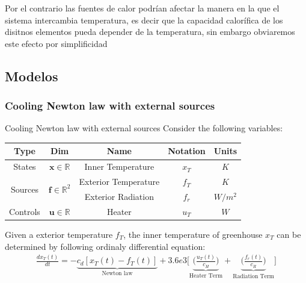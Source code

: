     Por el contrario las fuentes de calor podrían afectar la manera en la que el sistema intercambia  temperatura, es decir que la capacidad calorífica de los disitnos elementos pueda depender de la temperatura, sin embargo obviaremos este efecto por simplificidad
    
    \subsection{Modelos }
    
    \subsubsection{Cooling Newton law with external sources}
    
    \begin{model}{Cooling Newton law with external sources}{}\label{model:CoolNewton}
    Consider the following variables: 
    \begin{center}
        \begin{tabular}{|c|c|c|c|c|}
            \hline
            \textbf{Type} & \textbf{Dim} &\textbf{Name} & \textbf{Notation} & \textbf{Units} \\
                \hline
                \multirow{1}{*}{States}  & $\bm{x} \in \mathbb{R}$& Inner Temperature & $x_{T}$ & $K$ \\
                \hline
                \hline
                \multirow{2}{*}{Sources} & \multirow{2}{*}{$\bm{f} \in \mathbb{R}^2$} & Exterior Temperature & $f_{T}$ & $K$ \\
                & & Exterior Radiation & $f_{r}$ & $W/m^2$ \\
                \hline
                \hline
                \multirow{1}{*}{Controls} & $\bm{u} \in \mathbb{R}$ & Heater         & $u_{T}$ & $W$ \\
                \hline
        \end{tabular}    
    \end{center}
        Given a exterior temperature $f_{T}$, the inner temperature of greenhouse $x_{T}$ can be determined by following ordinaly differential equation:  
        \begin{gather}\label{eq:CoolNewton_plus_sources}
            \frac{dx_{T}(t)}{dt} = -\underbrace{c_d[x_{T}(t) - f_{T}(t)]}_{\text{Newton law}} + 
            3.6e3  \Bigg[ 
                \underbrace{ \Bigg( \frac{u_{T}(t)}{c_H} \Bigg) }_{\text{Heater Term}} + 
                \underbrace{ \Bigg( \frac{f_{r}(t)}{ c_R } \Bigg) }_{\text{Radiation Term}} \Bigg]

\end{gather}
\end{model}
